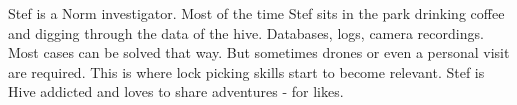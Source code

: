 \begin{npcBox}[title=Stef - a Norm investigator]
    \begin{stressSection}
    \end{stressSection}
    \begin{tabularx}{\textwidth}{ XX }
    \end{tabularx}

    \begin{consequences}
    \item {}
    \item {}
    \item {}
    \end{consequences}

    \begin{npcDescription}
    Stef is a Norm investigator. Most of the time Stef sits in the park drinking coffee and digging through the data of the hive. Databases, logs, camera recordings. Most cases can be solved that way. But sometimes drones or even a personal visit are required. This is where lock picking skills start to become relevant.
    Stef is Hive addicted and loves to share adventures - for likes.
    \end{npcDescription}

\end{npcBox}

\newpage

